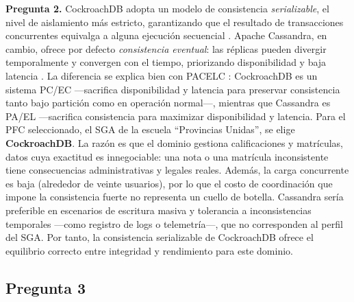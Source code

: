 \documentclass[10pt,a4paper]{article}
\begin{document}
\textbf{Pregunta 2.} CockroachDB adopta un modelo de consistencia \emph{serializable},
el nivel de aislamiento más estricto, garantizando que el resultado de transacciones
concurrentes equivalga a alguna ejecución secuencial \cite{taft2020}. Apache Cassandra,
en cambio, ofrece por defecto \emph{consistencia eventual}: las réplicas pueden divergir
temporalmente y convergen con el tiempo, priorizando disponibilidad y baja latencia
\cite{decandia2007}. La diferencia se explica bien con PACELC \cite{abadi2012}:
CockroachDB es un sistema PC/EC —sacrifica disponibilidad y latencia para preservar
consistencia tanto bajo partición como en operación normal—, mientras que Cassandra es
PA/EL —sacrifica consistencia para maximizar disponibilidad y latencia. Para el PFC
seleccionado, el SGA de la escuela ``Provincias Unidas'', se elige \textbf{CockroachDB}.
La razón es que el dominio gestiona calificaciones y matrículas, datos cuya exactitud es
innegociable: una nota o una matrícula inconsistente tiene consecuencias administrativas
y legales reales. Además, la carga concurrente es baja (alrededor de veinte usuarios),
por lo que el costo de coordinación que impone la consistencia fuerte no representa un
cuello de botella. Cassandra sería preferible en escenarios de escritura masiva y
tolerancia a inconsistencias temporales —como registro de logs o telemetría—, que no
corresponden al perfil del SGA. Por tanto, la consistencia serializable de CockroachDB
ofrece el equilibrio correcto entre integridad y rendimiento para este dominio.

\subsection*{Pregunta 3}
\end{document}
